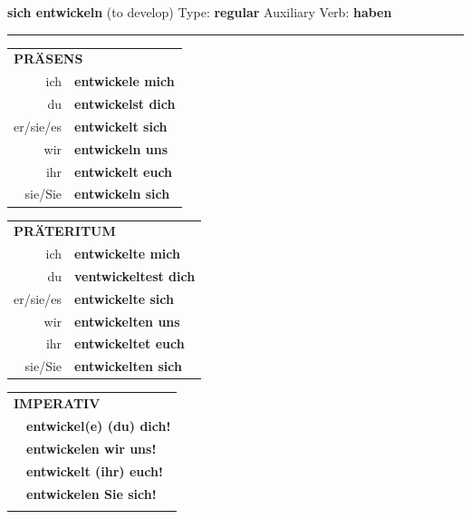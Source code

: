 \documentclass[10pt,a4paper]{revtex4-2}
\begin{document}
\begin{verbbox}
        {\Large \bf sich entwickeln} (to develop) \hfill Type: \textbf{regular} \hfill Auxiliary Verb: \textbf{haben} 
    
       \vspace{5pt}

    \hrule
    
    \vspace{5pt}

  \begin{tabular}{rl}
     \multicolumn{2}{l}{\textbf{PRÄSENS} }\\
    ich & \textbf{entwickele mich}\\
    du & \textbf{entwickelst dich}\\
    er/sie/es & \textbf{entwickelt sich}\\
    wir & \textbf{entwickeln uns}\\
    ihr & \textbf{entwickelt euch}\\
    sie/Sie & \textbf{entwickeln sich}\\
  \end{tabular}
  \hfill
     \begin{tabular}{rl}
    \multicolumn{2}{l}{\textbf{PRÄTERITUM} }\\
    ich & \textbf{entwickelte mich}\\
    du & \textbf{ventwickeltest dich}\\
    er/sie/es & \textbf{entwickelte sich}\\
    wir & \textbf{entwickelten uns}\\
    ihr & \textbf{entwickeltet euch}\\
    sie/Sie & \textbf{entwickelten sich}\\
  \end{tabular}
  \hfill
  \begin{tabular}{rl}
     \multicolumn{2}{l}{\textbf{IMPERATIV} }\\
   & \textbf{entwickel(e) (du) dich!}\\
   & \textbf{entwickelen wir uns!}\\
   & \textbf{entwickelt (ihr) euch!}\\
   & \textbf{entwickelen Sie sich!}\\
   & \vspace{10pt}
  \end{tabular}

    \vspace{10pt}


\end{verbbox}
\end{document}
